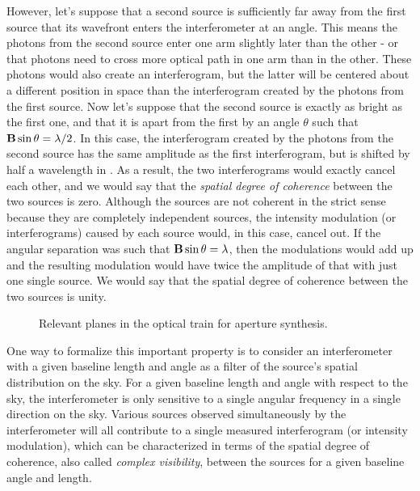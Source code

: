 However, let's suppose that a second source is sufficiently far away from the first source that its wavefront enters the interferometer at an angle. This means the photons from the second source enter one arm slightly later than the other - or that photons need to cross more optical path in one arm than in the other. These photons would also create an interferogram, but the latter will be centered about a different position in \OPD  space than the interferogram created by the photons from the first source. Now let's suppose that the second source is exactly as bright as the first one, and that it is apart from the first by an angle $\theta$ such that $\mathbf{B}\sin\theta = \lambda/2$. In this case,  the interferogram created by the photons from the second source has the same amplitude as the first interferogram, but is shifted by half a wavelength in \OPD. As a result, the two interferograms would exactly cancel each other, and we would say that the \textit{spatial degree of coherence} between the two sources is zero. Although the sources are not coherent in the strict sense because they are completely independent sources, the intensity modulation (or interferograms) caused by each source would, in this case, cancel out. If the angular separation was such that $\mathbf{B}\sin\theta = \lambda$, then the modulations would add up and the resulting modulation would have twice the amplitude of that with just one single source. We would say that the spatial degree of coherence between the two sources is unity. 

\begin{figure}[!ht]
	\centering
	
	\caption[Aperture synthesis]{Relevant planes in the optical train for aperture synthesis.}
	\label{fig:aperturesynthesis}
    \end{figure}



One way to formalize this important property is to consider an interferometer with a given baseline length and angle as a filter of the source's spatial distribution on the sky. For a given baseline length and angle with respect to the sky, the interferometer is only sensitive to a single angular frequency in a single direction on the sky. Various sources observed simultaneously by the interferometer will all contribute to a single measured interferogram (or intensity modulation), which can be characterized in terms of the spatial degree of coherence, also called \textit{complex visibility}, between the sources for a given baseline angle and length. 

